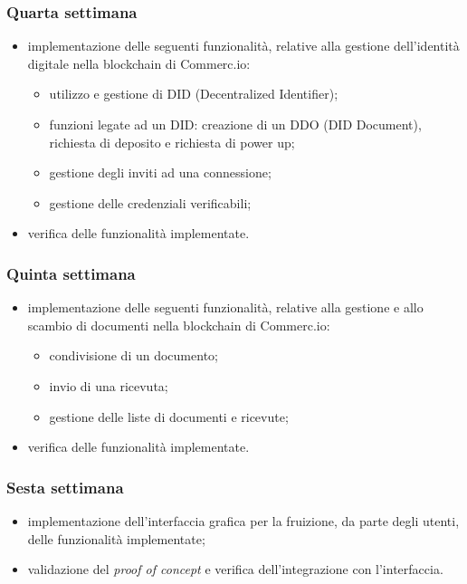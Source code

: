{    \subsubsection{Quarta settimana} 
    \begin{itemize}
        \item implementazione delle seguenti funzionalità, relative alla gestione dell'identità digitale nella blockchain di Commerc.io:
        \begin{itemize}
        	\item utilizzo e gestione di DID (Decentralized Identifier);
        	\item funzioni legate ad un DID: creazione di un DDO (DID Document), richiesta di deposito e richiesta di power up;
        	\item gestione degli inviti ad una connessione;
        	\item gestione delle credenziali verificabili;
        \end{itemize}
    	\item verifica delle funzionalità implementate.
    \end{itemize}

    \subsubsection{Quinta settimana} 
    \begin{itemize}
        \item implementazione delle seguenti funzionalità, relative alla gestione e allo scambio di documenti nella blockchain di Commerc.io:
        \begin{itemize}
        	\item condivisione di un documento;
        	\item invio di una ricevuta;
        	\item gestione delle liste di documenti e ricevute;
        \end{itemize}
   		\item verifica delle funzionalità implementate.
    \end{itemize}

    \subsubsection{Sesta settimana} 
    \begin{itemize}
        \item implementazione dell'interfaccia grafica per la fruizione, da parte degli utenti, delle funzionalità implementate;
        \item validazione del \textit{proof of concept} e verifica dell'integrazione con l'interfaccia.
    \end{itemize}

}
